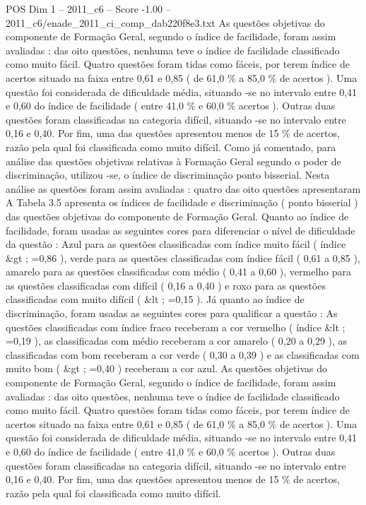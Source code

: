 \begin{textsample}{POS Dim 1 – 2011\_c6 – Score -1.00 – 2011\_c6/enade\_2011\_ci\_comp\_dab220f8e3.txt}
As questões objetivas do componente de Formação Geral, segundo o índice de facilidade, foram assim avaliadas : das oito questões, nenhuma teve o índice de facilidade classificado como muito fácil.
Quatro questões foram tidas como fáceis, por terem índice de acertos situado na faixa entre 0,61 e 0,85 ( de 61,0 \% a 85,0 \% de acertos ).
Uma questão foi considerada de dificuldade média, situando -se no intervalo entre 0,41 e 0,60 do índice de facilidade ( entre 41,0 \% e 60,0 \% acertos ).
Outras duas questões foram classificadas na categoria difícil, situando -se no intervalo entre 0,16 e 0,40.
Por fim, uma das questões apresentou menos de 15 \% de acertos, razão pela qual foi classificada como muito difícil.
Como já comentado, para análise das questões objetivas relativas à Formação Geral segundo o poder de discriminação, utilizou -se, o índice de discriminação ponto bisserial.
Nesta análise as questões foram assim avaliadas : quatro das oito questões apresentaram A Tabela 3.5 apresenta os índices de facilidade e discriminação ( ponto bisserial ) das questões objetivas do componente de Formação Geral.
Quanto ao índice de facilidade, foram usadas as seguintes cores para diferenciar o nível de dificuldade da questão : Azul para as questões classificadas com índice muito fácil ( índice \&gt ; =0,86 ), verde para as questões classificadas com índice fácil ( 0,61 a 0,85 ), amarelo para as questões classificadas com médio ( 0,41 a 0,60 ), vermelho para as questões classificadas com difícil ( 0,16 a 0,40 ) e roxo para as questões classificadas com muito difícil ( \&lt ; =0,15 ).
Já quanto ao índice de discriminação, foram usadas as seguintes cores para qualificar a questão : As questões classificadas com índice fraco receberam a cor vermelho ( índice \&lt ; =0,19 ), as classificadas com médio receberam a cor amarelo ( 0,20 a 0,29 ), as classificadas com bom receberam a cor verde ( 0,30 a 0,39 ) e as classificadas com muito bom ( \&gt ; =0,40 ) receberam a cor azul.
As questões objetivas do componente de Formação Geral, segundo o índice de facilidade, foram assim avaliadas : das oito questões, nenhuma teve o índice de facilidade classificado como muito fácil.
Quatro questões foram tidas como fáceis, por terem índice de acertos situado na faixa entre 0,61 e 0,85 ( de 61,0 \% a 85,0 \% de acertos ).
Uma questão foi considerada de dificuldade média, situando -se no intervalo entre 0,41 e 0,60 do índice de facilidade ( entre 41,0 \% e 60,0 \% acertos ).
Outras duas questões foram classificadas na categoria difícil, situando -se no intervalo entre 0,16 e 0,40.
Por fim, uma das questões apresentou menos de 15 \% de acertos, razão pela qual foi classificada como muito difícil.

\end{textsample}
